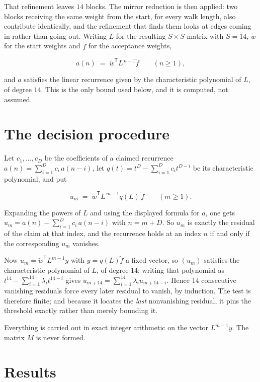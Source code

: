 \documentclass[11pt]{article}
\theoremstyle{definition}
\begin{document}
That refinement leaves $14$ blocks. The mirror reduction is then applied: two blocks receiving the same weight from the start, for every walk length, also contribute identically, and the refinement that finds them looks at edges coming in rather than going out. Writing $L$ for the resulting $S \times S$ matrix with $S = 14$, $\tilde w$ for the start weights and $\tilde f$ for the acceptance weights,

\[a(n) \;=\; \tilde w^{\mathsf T} L^{\,n-1} \tilde f \qquad (n \ge 1),\]

and $a$ satisfies the linear recurrence given by the characteristic polynomial of $L$, of degree $14$. This is the only bound used below, and it is computed, not assumed.

\section{The decision procedure}

Let $c_1,\dots,c_D$ be the coefficients of a claimed recurrence $a(n) = \sum_{i=1}^{D} c_i\,a(n-i)$, let $q(t) = t^{D} - \sum_{i=1}^{D} c_i t^{D-i}$ be its characteristic polynomial, and put

\[u_m \;=\; \tilde w^{\mathsf T} L^{\,m-1} q(L)\,\tilde f \qquad (m \ge 1).\]

Expanding the powers of $L$ and using the displayed formula for $a$, one gets $u_m = a(n) - \sum_{i=1}^{D} c_i\,a(n-i)$ with $n = m + D$. So $u_m$ is exactly the residual of the claim at that index, and the recurrence holds at an index $n$ if and only if the corresponding $u_m$ vanishes.

Now $u_m = \tilde w^{\mathsf T} L^{m-1} y$ with $y = q(L)\tilde f$ a fixed vector, so $(u_m)$ satisfies the characteristic polynomial of $L$, of degree $14$: writing that polynomial as $t^{14} - \sum_{i=1}^{14} \lambda_i t^{14-i}$ gives $u_{m+14} = \sum_{i=1}^{14} \lambda_i u_{m+14-i}$. Hence $14$ consecutive vanishing residuals force every later residual to vanish, by induction. The test is therefore finite; and because it locates the {\itshape last} nonvanishing residual, it pins the threshold exactly rather than merely bounding it.

Everything is carried out in exact integer arithmetic on the vector $L^{m-1}y$. The matrix $M$ is never formed.

\section{Results}
\end{document}
